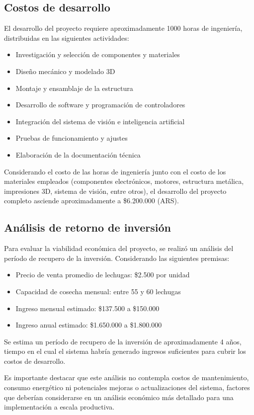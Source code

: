 \subsection{Costos de desarrollo}

El desarrollo del proyecto requiere aproximadamente 1000 horas de ingeniería, distribuidas en las siguientes actividades:

\begin{itemize}
    \item Investigación y selección de componentes y materiales
    \item Diseño mecánico y modelado 3D
    \item Montaje y ensamblaje de la estructura
    \item Desarrollo de software y programación de controladores
    \item Integración del sistema de visión e inteligencia artificial
    \item Pruebas de funcionamiento y ajustes
    \item Elaboración de la documentación técnica
\end{itemize}

Considerando el costo de las horas de ingeniería junto con el costo de los materiales empleados (componentes electrónicos, motores, estructura metálica, impresiones 3D, sistema de visión, entre otros), el desarrollo del proyecto completo asciende aproximadamente a \$6.200.000 (ARS).

\subsection{Análisis de retorno de inversión}

Para evaluar la viabilidad económica del proyecto, se realizó un análisis del período de recupero de la inversión. Considerando las siguientes premisas:

\begin{itemize}
    \item Precio de venta promedio de lechugas: \$2.500 por unidad
    \item Capacidad de cosecha mensual: entre 55 y 60 lechugas
    \item Ingreso mensual estimado: \$137.500 a \$150.000
    \item Ingreso anual estimado: \$1.650.000 a \$1.800.000
\end{itemize}

Se estima un período de recupero de la inversión de aproximadamente 4 años, tiempo en el cual el sistema habría generado ingresos suficientes para cubrir los costos de desarrollo.

Es importante destacar que este análisis no contempla costos de mantenimiento, consumo energético ni potenciales mejoras o actualizaciones del sistema, factores que deberían considerarse en un análisis económico más detallado para una implementación a escala productiva.
